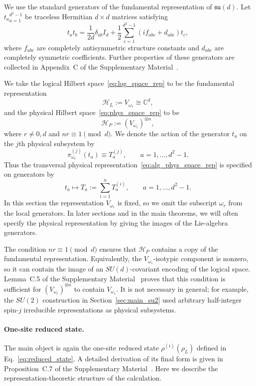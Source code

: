 \documentclass[10pt,twocolumn,superscriptaddress,aps,amsmath,amssymb,citeautoscript,floatfix,prx,longbibliography]{revtex4-2}
\newcounter{alg}
\theoremstyle{plain}
\theoremstyle{plain}
\theoremstyle{plain}
\theoremstyle{plain}
\theoremstyle{plain}
\theoremstyle{plain}
\begin{document}
We use the standard generators of the fundamental representation of $\mathfrak{su}(d)$. Let ${t_a}_{a=1}^{d^2-1}$ be traceless Hermitian $d\times d$ matrices satisfying
\begin{equation}
t_a t_b
=
\frac{1}{2d}\delta_{ab}I_d
+
\frac12
\sum_{c=1}^{d^2-1}
\left(i f_{abc}+d_{abc}\right)t_c ,
\end{equation}
where $f_{abc}$ are completely antisymmetric structure constants and $d_{abc}$ are completely symmetric coefficients. Further properties of these generators are collected in Appendix~C of the Supplementary Material~\cite{SuppMat}.

We take the logical Hilbert space~\eqref{eq:log_space_rep} to be the fundamental representation
$$
\mathcal H_L:=V_{\omega_1}\cong \mathbb C^d ,
$$
and the physical Hilbert space~\eqref{eq:phys_space_rep} to be
$$
\mathcal H_P:=(V_{\omega_r})^{\otimes n},
$$
where $r\neq 0,d$ and $nr\equiv 1\pmod d$. We denote the action of the generator $t_a$ on the $j$th physical subsystem by
$$
\pi_{\omega_r}^{(j)}(t_a)\equiv T_a^{(j)},
\qquad
a=1,\ldots,d^2-1 .
$$
Thus the transversal physical representation~\eqref{eq:alg_phys_space_rep} is specified on generators by
$$
t_a
\longmapsto
T_a
:=
\sum_{i=1}^n T_a^{(i)},
\qquad
a=1,\ldots,d^2-1 .
$$
In this section the representation $V_{\omega_r}$ is fixed, so we omit the subscript $\omega_r$ from the local generators. In later sections and in the main theorems, we will often specify the physical representation by giving the images of the Lie-algebra generators.

The condition $nr\equiv 1\pmod d$ ensures that $\mathcal H_P$ contains a copy of the fundamental representation. Equivalently, the $V_{\omega_1}$-isotypic component is nonzero, so it can contain the image of an $SU(d)$-covariant encoding of the logical space. Lemma~C.5 of the Supplementary Material~\cite{SuppMat} proves that this condition is sufficient for $(V_{\omega_r})^{\otimes n}$ to contain $V_{\omega_1}$. It is not necessary in general; for example, the $SU(2)$ construction in Section~\ref{sec:main_su2} used arbitrary half-integer spin-$j$ irreducible representations as physical subsystems.

\paragraph{One-site reduced state.}

The main object is again the one-site reduced state $\rho^{(i)}(\rho_L)$ defined in Eq.~\eqref{eq:reduced_state}. A detailed derivation of its final form is given in Proposition~C.7 of the Supplementary Material~\cite{SuppMat}. Here we describe the representation-theoretic structure of the calculation.
\end{document}
